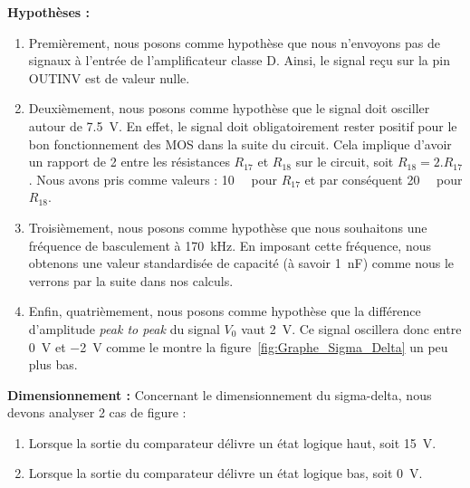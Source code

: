 \documentclass[10pt, oneside, a4paper]{article}
\begin{document}
\newpage
\noindent\textbf{Hypothèses :}
\begin{enumerate}
    \item Premièrement, nous posons comme hypothèse que nous n'envoyons pas de signaux
        à l'entrée de l'amplificateur classe D.
        Ainsi, le signal reçu sur la pin OUTINV est de valeur nulle.
    \item Deuxièmement, nous posons comme hypothèse que le signal doit osciller autour
        de \SI{7.5}{\volt}.
        En effet, le signal doit obligatoirement rester positif pour le bon fonctionnement
        des MOS dans la suite du circuit.
        Cela implique d'avoir un rapport de 2 entre les résistances $R_{17}$ et $R_{18}$ sur
        le circuit, soit $R_{18} = 2.R_{17}$.
        Nous avons pris comme valeurs : \SI{10}{\kilo\Omega} pour $R_{17}$ et par
        conséquent \SI{20}{\kilo\Omega} pour $R_{18}$.
    \item Troisièmement, nous posons comme hypothèse que nous souhaitons une fréquence de
        basculement à \SI{170}{\kilo\hertz}.
        En imposant cette fréquence, nous obtenons une valeur standardisée de capacité (à savoir \SI{1}{\nano\farad}) comme 		nous le verrons par la suite dans nos calculs.
    \item Enfin, quatrièmement, nous posons comme hypothèse que la différence d'amplitude \textit{peak to peak} du signal 		$V_0$ vaut \SI{2}{\volt}. Ce signal oscillera donc entre \SI{0}{\volt} et \SI{-2}{\volt} comme le montre la 					figure~\ref{fig:Graphe_Sigma_Delta} un peu plus bas. \\
\end{enumerate}

\noindent\textbf{Dimensionnement :} Concernant le dimensionnement du sigma-delta, nous devons analyser 2 cas de figure : 
\begin{enumerate}
    \item Lorsque la sortie du comparateur délivre un état logique haut, soit \SI{15}{\volt}.
    \item Lorsque la sortie du comparateur délivre un état logique bas, soit \SI{0}{\volt}. \\
\end{enumerate}
\end{document}
